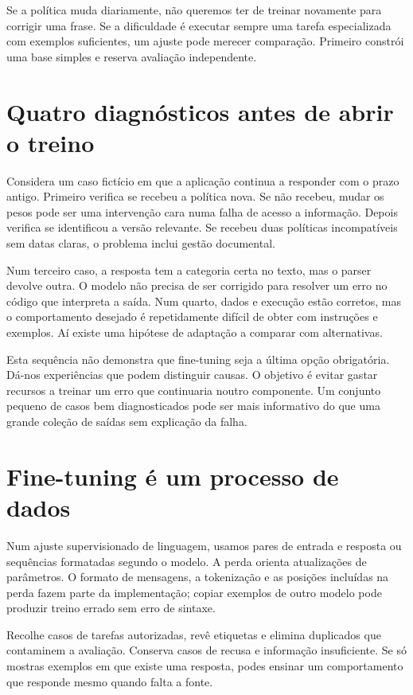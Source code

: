Se a política muda diariamente, não queremos ter de treinar novamente para corrigir uma frase. Se a dificuldade é executar sempre uma tarefa especializada com exemplos suficientes, um ajuste pode merecer comparação. Primeiro constrói uma base simples e reserva avaliação independente.

\section{Quatro diagnósticos antes de abrir o treino}
Considera um caso fictício em que a aplicação continua a responder com o prazo antigo. Primeiro verifica se recebeu a política nova. Se não recebeu, mudar os pesos pode ser uma intervenção cara numa falha de acesso a informação. Depois verifica se identificou a versão relevante. Se recebeu duas políticas incompatíveis sem datas claras, o problema inclui gestão documental.

Num terceiro caso, a resposta tem a categoria certa no texto, mas o parser devolve outra. O modelo não precisa de ser corrigido para resolver um erro no código que interpreta a saída. Num quarto, dados e execução estão corretos, mas o comportamento desejado é repetidamente difícil de obter com instruções e exemplos. Aí existe uma hipótese de adaptação a comparar com alternativas.

Esta sequência não demonstra que fine-tuning seja a última opção obrigatória. Dá-nos experiências que podem distinguir causas. O objetivo é evitar gastar recursos a treinar um erro que continuaria noutro componente. Um conjunto pequeno de casos bem diagnosticados pode ser mais informativo do que uma grande coleção de saídas sem explicação da falha.

\section{Fine-tuning é um processo de dados}
Num ajuste supervisionado de linguagem, usamos pares de entrada e resposta ou sequências formatadas segundo o modelo. A perda orienta atualizações de parâmetros. O formato de mensagens, a tokenização e as posições incluídas na perda fazem parte da implementação; copiar exemplos de outro modelo pode produzir treino errado sem erro de sintaxe.

Recolhe casos de tarefas autorizadas, revê etiquetas e elimina duplicados que contaminem a avaliação. Conserva casos de recusa e informação insuficiente. Se só mostras exemplos em que existe uma resposta, podes ensinar um comportamento que responde mesmo quando falta a fonte.

